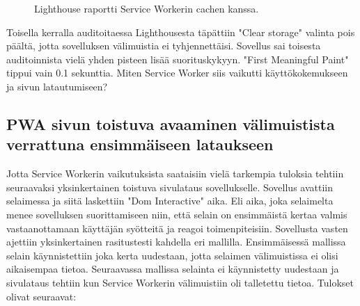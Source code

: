 \documentclass{tktltiki}
\begin{document}
\begin{figure}[h]
\begin{center}
\caption{Lighthouse raportti Service Workerin cachen kanssa.}
\label{Lighthouse raportti 3}
\end{center}
\end{figure}

Toisella kerralla auditoitaessa Lighthousesta täpättiin "Clear storage" valinta pois päältä, jotta sovelluksen välimuistia ei tyhjennettäisi. Sovellus sai toisesta auditoinnista vielä yhden pisteen lisää suorituskykyyn. "First Meaningful Paint" tippui vain 0.1 sekunttia. Miten Service Worker siis vaikutti käyttökokemukseen ja sivun latautumiseen?

\subsection{PWA sivun toistuva avaaminen välimuistista verrattuna ensimmäiseen lataukseen}

Jotta Service Workerin vaikutuksista saataisiin vielä tarkempia tuloksia tehtiin seuraavaksi yksinkertainen toistuva sivulataus sovellukselle. Sovellus avattiin selaimessa ja siitä laskettiin "Dom Interactive" aika. Eli aika, joka selaimelta menee sovelluksen suorittamiseen niin, että selain on ensimmäistä kertaa valmis vastaanottamaan käyttäjän syötteitä ja reagoi toimenpiteisiin. Sovellusta vasten ajettiin yksinkertainen rasitustesti kahdella eri mallilla. Ensimmäisessä mallissa selain käynnistettiin joka kerta uudestaan, jotta selaimen välimuistissa ei olisi aikaisempaa tietoa. Seuraavassa mallissa selainta ei käynnistetty uudestaan ja sivulataus tehtiin kun Service Workerin välimuistiin oli talletettu tietoa. Tulokset olivat seuraavat:
\end{document}
